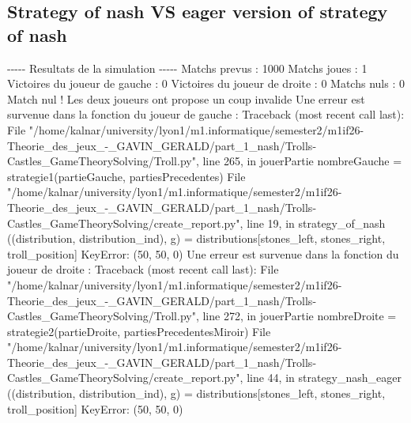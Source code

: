 \documentclass{article}%
\begin{document}
\subsection{Strategy of nash VS eager version of strategy of nash}%
\label{subsec:Strategy of nash VS eager version of strategy of nash}%
{-}{-}{-}{-}{-} Resultats de la simulation {-}{-}{-}{-}{-}\newline%
		\newline%
Matchs prevus : 1000\newline%
Matchs joues : 1\newline%
\newline%
Victoires du joueur de gauche : 0\newline%
Victoires du joueur de droite : 0\newline%
Matchs nuls : 0\newline%
\newline%
Match nul ! Les deux joueurs ont propose un coup invalide\newline%
Une erreur est survenue dans la fonction du joueur de gauche : \newline%
Traceback (most recent call last):\newline%
  File "/home/kalnar/university/lyon1/m1.informatique/semester2/m1if26{-}Theorie\_des\_jeux\_{-}\_GAVIN\_GERALD/part\_1\_nash/Trolls{-}Castles\_GameTheorySolving/Troll.py", line 265, in jouerPartie\newline%
    nombreGauche = strategie1(partieGauche, partiesPrecedentes)\newline%
  File "/home/kalnar/university/lyon1/m1.informatique/semester2/m1if26{-}Theorie\_des\_jeux\_{-}\_GAVIN\_GERALD/part\_1\_nash/Trolls{-}Castles\_GameTheorySolving/create\_report.py", line 19, in strategy\_of\_nash\newline%
    ((distribution, distribution\_ind), g) = distributions{[}stones\_left, stones\_right, troll\_position{]}\newline%
KeyError: (50, 50, 0)\newline%
\newline%
Une erreur est survenue dans la fonction du joueur de droite : \newline%
Traceback (most recent call last):\newline%
  File "/home/kalnar/university/lyon1/m1.informatique/semester2/m1if26{-}Theorie\_des\_jeux\_{-}\_GAVIN\_GERALD/part\_1\_nash/Trolls{-}Castles\_GameTheorySolving/Troll.py", line 272, in jouerPartie\newline%
    nombreDroite = strategie2(partieDroite, partiesPrecedentesMiroir)\newline%
  File "/home/kalnar/university/lyon1/m1.informatique/semester2/m1if26{-}Theorie\_des\_jeux\_{-}\_GAVIN\_GERALD/part\_1\_nash/Trolls{-}Castles\_GameTheorySolving/create\_report.py", line 44, in strategy\_nash\_eager\newline%
    ((distribution, distribution\_ind), g) = distributions{[}stones\_left, stones\_right, troll\_position{]}\newline%
KeyError: (50, 50, 0)\newline%
\end{document}
